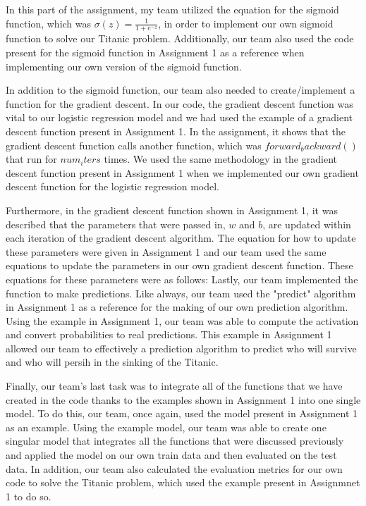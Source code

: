 \documentclass{IEEE}
\begin{document}
In this part of the assignment, my team utilized the equation for the sigmoid function, which was $\sigma(z) = \frac{1}{1+e^{-z}}$, in order to implement our own sigmoid function to solve our Titanic problem. Additionally, our team also used the code present for the sigmoid function in Assignment 1 as a reference when implementing our own version of the sigmoid function.

In addition to the sigmoid function, our team also needed to create/implement a function for the gradient descent. In our code, the gradient descent function was vital to our logistic regression model and we had used the example of a gradient descent function present in Assignment 1. In the assignment, it shows that the gradient descent function calls another function, which was $forward_backward()$ that run for $num_iters$ times. We used the same methodology in the gradient descent function present in Assignment 1 when we implemented our own gradient descent function for the logistic regression model.

Furthermore, in the gradient descent function shown in Assignment 1, it was described that the parameters that were passed in, $w$ and $b$, are updated within each iteration of the gradient descent algorithm. The equation for how to update these parameters were given in Assignment 1 and our team used the same equations to update the parameters in our own gradient descent function. These equations for these parameters were as follows:
Lastly, our team implemented the function to make predictions. Like always, our team used the "predict" algorithm in Assignment 1 as a reference for the making of our own prediction algorithm. Using the example in Assignment 1, our team was able to compute the activation and convert probabilities to real predictions. This example in Assignment 1 allowed our team to effectively a prediction algorithm to predict who will survive and who will persih in the sinking of the Titanic.

Finally, our team's last task was to integrate all of the functions that we have created in the code thanks to the examples shown in Assignment 1 into one single model. To do this, our team, once again, used the model present in Assignment 1 as an example. Using the example model, our team was able to create one singular model that integrates all the functions that were discussed previously and applied the model on our own train data and then evaluated on the test data. In addition, our team also calculated the evaluation metrics for our own code to solve the Titanic problem, which used the example present in Assignmnet 1 to do so.
\end{document}
